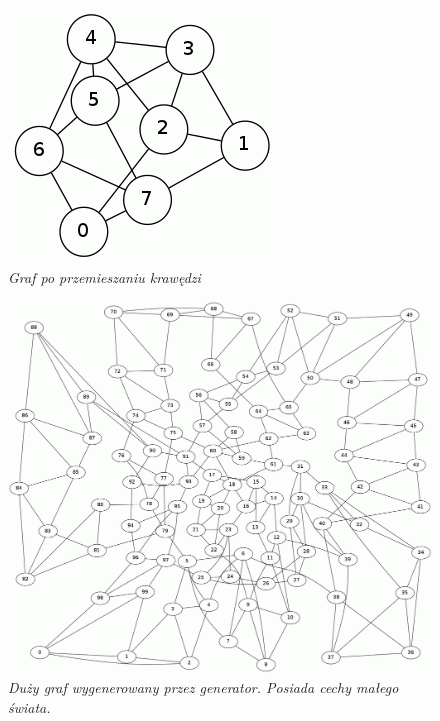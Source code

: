 \documentclass[a4paper, 12pt]{article}
\begin{document}
\begin{figure}[ht]
\begin{minipage}[b]{0.45\linewidth}
\includegraphics[width=\textwidth]{pomieszany.png}
\caption{\em Graf po przemieszaniu krawędzi}
\label{fig:pomiesz}
\end{minipage}
\end{figure}

\begin{figure}[ht]
\centering
\includegraphics[scale=0.23]{biggraph.png}
\caption{\em Duży graf wygenerowany przez generator. Posiada cechy małego świata.}
\label{fig:bignetwork}
\end{figure}
\end{document}
